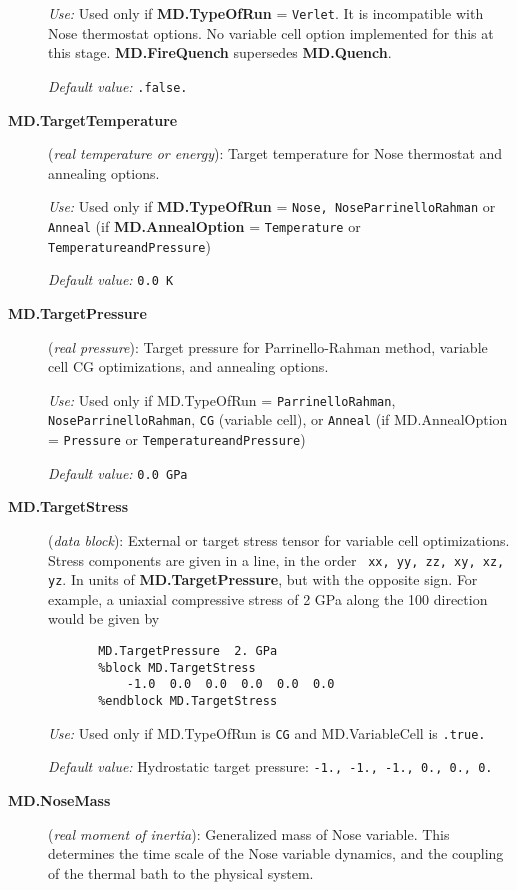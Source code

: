 \documentclass[11pt]{article}
\begin{document}
\begin{description}
{\it Use:} Used only if {\bf MD.TypeOfRun} = {\tt Verlet}. 
It is incompatible with Nose thermostat options. No variable
cell option implemented for this at this stage.
{\bf MD.FireQuench} supersedes {\bf MD.Quench}.

{\it Default value:} {\tt .false.}

\item[{\bf MD.TargetTemperature}] ({\it real temperature or energy}): 
Target temperature for Nose thermostat and annealing options.

{\it Use:} Used only if {\bf MD.TypeOfRun} = {\tt Nose, NoseParrinelloRahman}
or {\tt Anneal} (if {\bf MD.AnnealOption} = {\tt Temperature} or 
{\tt TemperatureandPressure})

{\it Default value:} {\tt 0.0 K}

\item[{\bf MD.TargetPressure}] ({\it real pressure}): 
Target pressure for Parrinello-Rahman method, variable cell CG optimizations,
and annealing options.

{\it Use:} Used only if MD.TypeOfRun = 
{\tt ParrinelloRahman}, {\tt NoseParrinelloRahman},
{\tt CG} (variable cell), or {\tt Anneal} 
(if MD.AnnealOption = {\tt Pressure} or {\tt TemperatureandPressure})

{\it Default value:} {\tt 0.0 GPa}


\item[{\bf MD.TargetStress}] ({\it data block}):
External or target stress tensor for variable cell optimizations.
Stress components are given in a line, in the order {\tt
xx, yy, zz, xy, xz, yz}. In units of {\bf MD.TargetPressure},
but with the opposite sign. For example, a uniaxial compressive stress 
of 2 GPa along the 100 direction would be given by
\begin{verbatim}
       MD.TargetPressure  2. GPa
       %block MD.TargetStress
           -1.0  0.0  0.0  0.0  0.0  0.0
       %endblock MD.TargetStress
\end{verbatim}

{\it Use:} Used only if MD.TypeOfRun is {\tt CG} and 
MD.VariableCell is {\tt .true.} 
 
{\it Default value:} Hydrostatic target pressure: 
{\tt -1., -1., -1., 0., 0., 0.}



\item[{\bf MD.NoseMass}] ({\it real moment of inertia}): 
Generalized mass of Nose variable.
This determines the time scale of the Nose variable
dynamics, and the coupling of the thermal bath to
the physical system.


\end{description}
\end{document}
